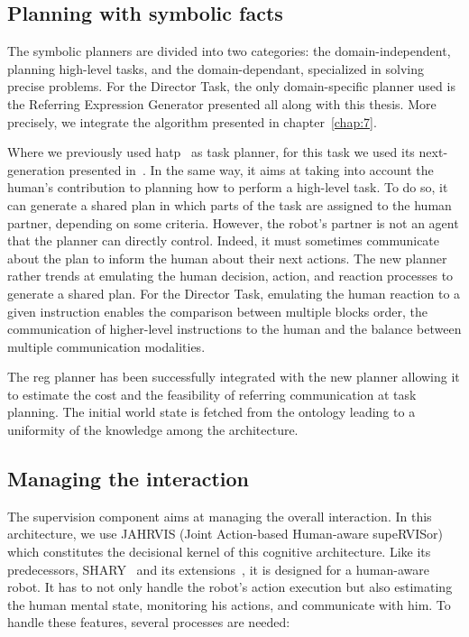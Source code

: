 \subsection{Planning with symbolic facts}

The symbolic planners are divided into two categories: the domain-independent, planning high-level tasks, and the domain-dependant, specialized in solving precise problems. For the Director Task, the only domain-specific planner used is the Referring Expression Generator presented all along with this thesis. More precisely, we integrate the algorithm presented in chapter~\ref{chap:7}.

Where we previously used \acrshort{hatp}~\cite{lallement_2014_hatp} as task planner, for this task we used its next-generation presented in~\cite{buisan_2021_human}. In the same way, it aims at taking into account the human's contribution to planning how to perform a high-level task. To do so, it can generate a shared plan in which parts of the task are assigned to the human partner, depending on some criteria. However, the robot's partner is not an agent that the planner can directly control. Indeed, it must sometimes communicate about the plan to inform the human about their next actions. The new planner rather trends at emulating the human decision, action, and reaction processes to generate a shared plan. For the Director Task, emulating the human reaction to a given instruction enables the comparison between multiple blocks order, the communication of higher-level instructions to the human and the balance between multiple communication modalities.

The \acrshort{reg} planner has been successfully integrated with the new planner allowing it to estimate the cost and the feasibility of referring communication at task planning. The initial world state is fetched from the ontology leading to a uniformity of the knowledge among the architecture.

\subsection{Managing the interaction}

The supervision component aims at managing the overall interaction. In this architecture, we use JAHRVIS (Joint Action-based Human-aware supeRVISor) which constitutes the decisional kernel of this cognitive architecture. Like its predecessors, SHARY~\cite{clodic_2009_shary} and its extensions~\cite{fiore_2016_planning, devin_2016_implemented}, it is designed for a human-aware robot. It has to not only handle the robot's action execution but also estimating the human mental state, monitoring his actions, and communicate with him. To handle these features, several processes are needed:


